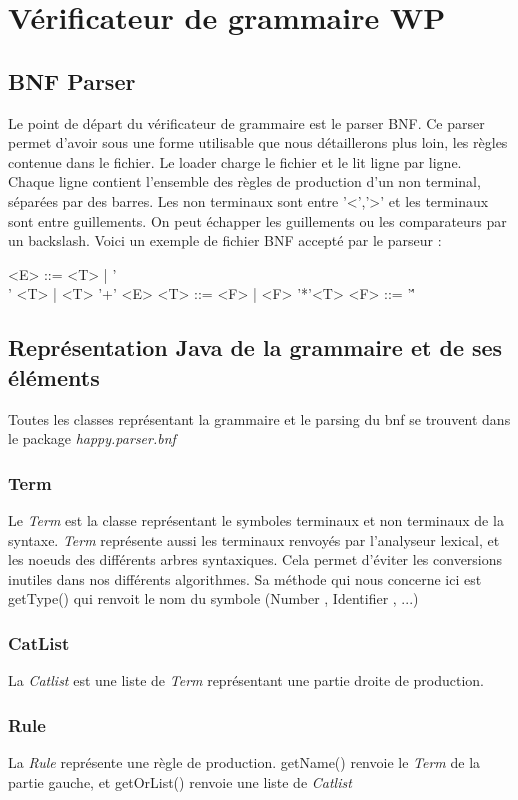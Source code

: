 \section{Vérificateur de grammaire WP}
	\subsection{BNF Parser}
	Le point de départ du vérificateur de grammaire est le parser BNF. Ce parser permet d'avoir sous une forme utilisable que nous détaillerons 
plus loin, les règles contenue dans le fichier. Le loader charge le fichier et le lit ligne par ligne. Chaque ligne contient l'ensemble des règles
de production d'un non terminal, séparées par des barres. Les non terminaux sont entre '<','>' et les terminaux sont entre guillements. On peut
échapper les guillements ou les comparateurs par un backslash. 
Voici un exemple de fichier BNF accepté par le parseur : 

\begin{verbatim*}
	  <E> ::= <T> | '\\' <T> | <T> '+' <E>
	  <T> ::= <F> | <F> '*'<T>
	  <F> ::= '\''
\end{verbatim*}

	\subsection{Représentation Java de la grammaire et de ses éléments}
		Toutes les classes représentant la grammaire et le parsing du bnf se trouvent dans le package \emph{happy.parser.bnf}
		\subsubsection{Term} Le \emph{Term} est la classe représentant le symboles terminaux et non terminaux de la syntaxe. \emph{Term}
		représente aussi les terminaux renvoyés par l'analyseur lexical, et les noeuds des différents arbres syntaxiques. Cela permet d'éviter
		les conversions inutiles dans nos différents algorithmes. Sa méthode qui nous concerne ici est getType() qui renvoit le nom du symbole
		(Number , Identifier , ...)
		\subsubsection{CatList} La \emph{Catlist} est une liste de \emph{Term} représentant une partie droite de production. 
		\subsubsection{Rule}  La \emph{Rule} représente une règle de production. getName() renvoie le \emph{Term} de la partie gauche, 
		et getOrList() renvoie une liste de \emph{Catlist}

